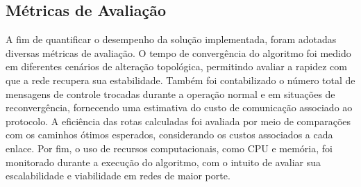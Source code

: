 \documentclass[12pt]{article}
\begin{document}
\subsection{Métricas de Avaliação}

A fim de quantificar o desempenho da solução implementada, foram adotadas diversas métricas de avaliação. O tempo de convergência do algoritmo foi medido em diferentes cenários de alteração topológica, permitindo avaliar a rapidez com que a rede recupera sua estabilidade. Também foi contabilizado o número total de mensagens de controle trocadas durante a operação normal e em situações de reconvergência, fornecendo uma estimativa do custo de comunicação associado ao protocolo. A eficiência das rotas calculadas foi avaliada por meio de comparações com os caminhos ótimos esperados, considerando os custos associados a cada enlace. Por fim, o uso de recursos computacionais, como CPU e memória, foi monitorado durante a execução do algoritmo, com o intuito de avaliar sua escalabilidade e viabilidade em redes de maior porte.





\end{document}
